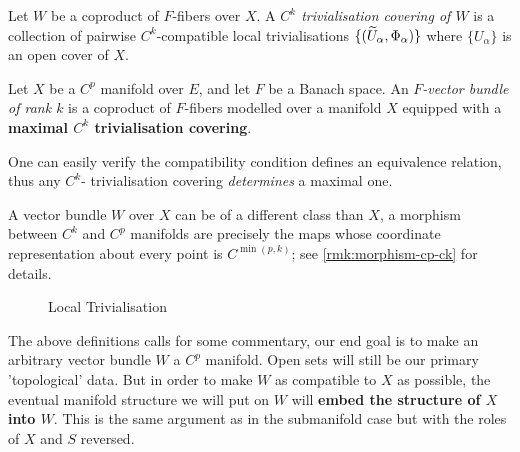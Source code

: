 \documentclass[../main-v2-manifolds.tex]{subfiles}
\begin{document}
%
%
\begin{definition}\label{def:trivialisation-covering}
    Let $W$ be a coproduct of $F$-fibers over $X$. A \emph{$C^k$ trivialisation covering of $W$} is a collection of pairwise $C^k$-compatible local trivialisations $\{(\widetilde{U}_{\alpha},\Phi_{\alpha})\}$ where $\{U_\alpha\}$ is an open cover of $X$.
\end{definition}
%
%
\begin{definition}\label{def:vector-bundle}
    Let $X$ be a $C^p$ manifold over $E$, and let $F$ be a Banach space. An \emph{$F$-vector bundle of rank $k$} is a coproduct of $F$-fibers modelled over a manifold $X$ equipped with a \textbf{maximal $C^k$ trivialisation covering}.
\end{definition}
\begin{remark}
    One can easily verify the compatibility condition defines an equivalence relation, thus any $C^k$- trivialisation covering \emph{determines} a maximal one.
\end{remark}
\begin{remark}[k vs. p]
    A vector bundle $W$ over $X$ can be of a different class than $X$, a morphism between $C^k$ and $C^p$ manifolds are precisely the maps whose coordinate representation about every point is $C^{\min(p,k)}$; see \cref{rmk:morphism-cp-ck} for details.
\end{remark} 
    \begin{figure}
\centering
{}
\caption{Local Trivialisation}
\label{fig:local-trivialisation}
\end{figure}
The above definitions calls for some commentary, our end goal is to make an arbitrary vector bundle $W$ a $C^p$ manifold. Open sets will still be our primary 'topological' data. But in order to make $W$ as compatible to $X$ as possible, the eventual manifold structure we will put on $W$ will \textbf{embed the structure of $X$ into $W$}. This is the same argument as in the submanifold case but with the roles of $X$ and $S$ reversed.\\
\end{document}
